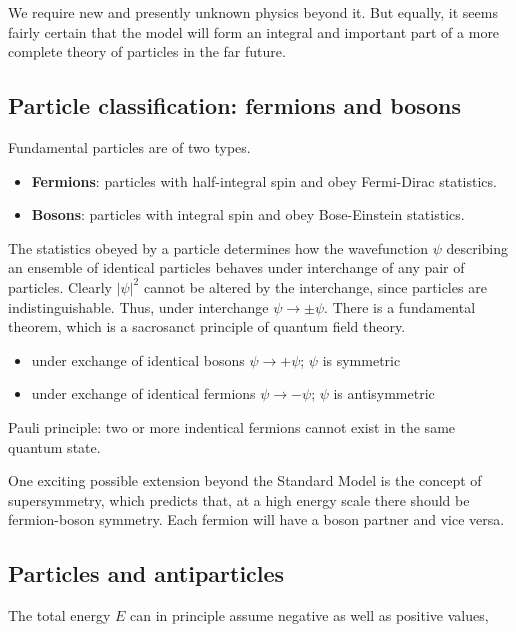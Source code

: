 \documentclass[en, device=normal]{elegantnote}
\begin{document}
We require new and presently unknown physics beyond it. But equally, it seems fairly certain 
that the model will form an integral and important part of a more complete theory of particles in the far future.

\subsection{Particle classification: fermions and bosons}

Fundamental particles are of two types.

\begin{itemize}
  \item \textbf{Fermions}: particles with half-integral spin and obey Fermi-Dirac statistics.
  \item \textbf{Bosons}: particles with integral spin and obey Bose-Einstein statistics.
\end{itemize}

The statistics obeyed by a particle determines how the wavefunction $\psi$ describing 
an ensemble of identical particles behaves under interchange of any pair of particles. 
Clearly $\vert\psi\vert^2$ cannot be altered by the interchange, since particles are 
indistinguishable. Thus, under interchange $\psi\rightarrow\pm\psi$. There is a fundamental 
theorem, which is a sacrosanct principle of quantum field theory.

\begin{itemize}
  \item under exchange of identical bosons $\psi\rightarrow +\psi$; $\psi$ is symmetric
  \item under exchange of identical fermions $\psi\rightarrow -\psi$; $\psi$ is antisymmetric
\end{itemize}

Pauli principle: two or more indentical fermions cannot exist in the same quantum state.

One exciting possible extension beyond the Standard Model is the concept of supersymmetry, which 
predicts that, at a high energy scale there should be fermion-boson symmetry. Each fermion 
will have a boson partner and vice versa.

\subsection{Particles and antiparticles}

The total energy $E$ can in principle assume negative as well as positive values,
\end{document}
